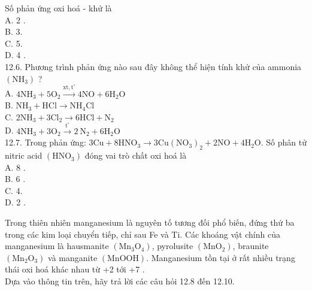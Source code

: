 \documentclass[10pt]{article}
\begin{document}
Số phản ứng oxi hoá - khử là\\
A. 2 .\\
B. 3.\\
C. 5.\\
D. 4 .\\
12.6. Phương trình phản ứng nào sau đây không thể hiện tính khử của ammonia $\left(\mathrm{NH}_{3}\right)$ ?\\
A. $4 \mathrm{NH}_{3}+5 \mathrm{O}_{2} \xrightarrow{\mathrm{xt}, \mathrm{t}^{\circ}} 4 \mathrm{NO}+6 \mathrm{H}_{2} \mathrm{O}$\\
B. $\mathrm{NH}_{3}+\mathrm{HCl} \rightarrow \mathrm{NH}_{4} \mathrm{Cl}$\\
C. $2 \mathrm{NH}_{3}+3 \mathrm{Cl}_{2} \rightarrow 6 \mathrm{HCl}+\mathrm{N}_{2}$\\
D. $4 \mathrm{NH}_{3}+3 \mathrm{O}_{2} \xrightarrow{\mathrm{t}^{\circ}} 2 \mathrm{~N}_{2}+6 \mathrm{H}_{2} \mathrm{O}$\\
12.7. Trong phản ứng: $3 \mathrm{Cu}+8 \mathrm{HNO}_{3} \rightarrow 3 \mathrm{Cu}\left(\mathrm{NO}_{3}\right)_{2}+2 \mathrm{NO}+4 \mathrm{H}_{2} \mathrm{O}$. Số phân tử nitric acid $\left(\mathrm{HNO}_{3}\right)$ đóng vai trò chất oxi hoá là\\
A. 8 .\\
B. 6 .\\
C. 4.\\
D. 2 .

Trong thiên nhiên manganesium là nguyên tố tương đối phổ biến, đứng thứ ba trong các kim loại chuyển tiếp, chỉ sau Fe và Ti. Các khoáng vật chính của manganesium là hausmanite $\left(\mathrm{Mn}_{3} \mathrm{O}_{4}\right)$, pyrolusite $\left(\mathrm{MnO}_{2}\right)$, braunite $\left(\mathrm{Mn}_{2} \mathrm{O}_{3}\right)$ và manganite $(\mathrm{MnOOH})$. Manganesium tồn tại ở rất nhiều trạng thái oxi hoá khác nhau từ +2 tới +7 .\\
Dựa vào thông tin trên, hãy trả lời các câu hỏi 12.8 đến 12.10.
\end{document}
